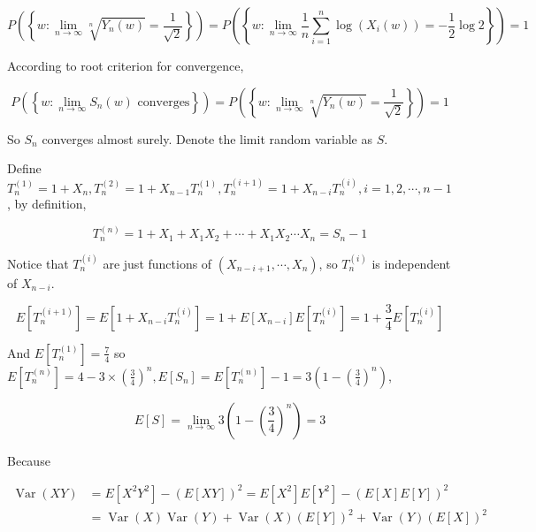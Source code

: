 \documentclass{article}
\begin{document}
\begin{equation}
    P\left(\left\{w:\lim_{n\to \infty} \sqrt[n]{Y_n(w)} = \frac{1}{\sqrt{2}}\right\}\right) = P\left(\left\{w:\lim_{n\to \infty} \frac{1}{n}\sum_{i=1}^n \log (X_i(w))=-\frac{1}{2} \log2\right\}\right) = 1
\end{equation}

According to root criterion for convergence,

\begin{equation}
    P\left(\left\{w:\lim_{n\to \infty} S_n(w) \text{ converges} \right\}\right) = P\left(\left\{w:\lim_{n\to \infty} \sqrt[n]{Y_n(w)} = \frac{1}{\sqrt{2}}\right\}\right) = 1
\end{equation}

So $S_n$ converges almost surely. Denote the limit random variable as $S$.


Define $T_n^{(1)} = 1 + X_n,T_n^{(2)} = 1+ X_{n-1}T_n^{(1)},T_n^{(i+1)} = 1+ X_{n-i}T_n^{(i)}, i =1,2,\cdots,n-1$, by definition,

\begin{equation}
    T_n^{(n)} = 1+ X_1 + X_1X_2 + \cdots + X_1X_2\cdots X_n = S_n -1 
\end{equation}

Notice that $T_n^{(i)}$ are just functions of $(X_{n-i+1},\cdots,X_n)$, so $T_n^{(i)}$ is independent of $X_{n-i}$.

\begin{equation}
    E[T_n^{(i+1)}] = E[1+ X_{n-i}T_n^{(i)}] = 1 + E[X_{n-i}] E[T_n^{(i)}] =  1+ \frac{3}{4} E[T_n^{(i)}]
\end{equation}

And $E[T_n^{(1)}] = \frac{7}{4}$ so $E[T_n^{(n)}] = 4 - 3 \times (\frac{3}{4})^n, E[S_n] = E[T_n^{(n)}] - 1 = 3(1-(\frac{3}{4})^n)$,


\begin{equation}
    E[S] = \lim_{n \to \infty}  3(1-(\frac{3}{4})^n) = 3
\end{equation}


Because

\begin{equation}
    \begin{aligned}
        \operatorname{Var}(XY) & = E[X^2Y^2] - (E[XY])^2= E[X^2] E[Y^2] - (E[X]E[Y])^2 \\
        & = \operatorname{Var}(X)\operatorname{Var}(Y) + \operatorname{Var}(X) (E[Y])^2  +  \operatorname{Var}(Y) (E[X])^2 
    \end{aligned}
\end{equation}
\end{document}

